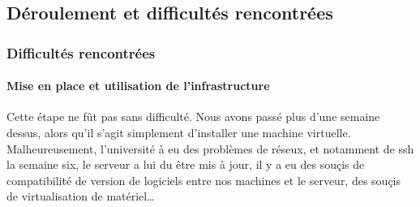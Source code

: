 \subsection{Déroulement et difficultés rencontrées}

	\subsubsection{Difficultés rencontrées}

		\paragraph{Mise en place et utilisation de l'infrastructure}
			Cette étape ne fût pas sans difficulté. Nous avons passé plus d'une semaine
		    dessus, alors qu'il s'agit simplement d'installer une machine
		    virtuelle. Malheureusement, l'université à eu des problèmes de réseux, et
		    notamment de ssh la semaine six, le serveur a lui du être mis à jour, il y a
		    eu des souçis de compatibilité de version de logiciels entre nos machines et
		    le serveur, des souçis de virtualisation de matériel\ldots